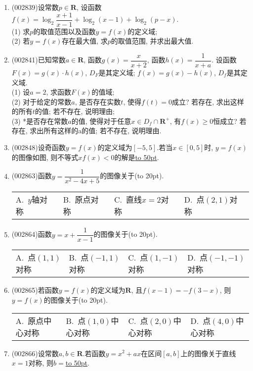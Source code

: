 \documentclass[10pt,a4paper]{article}
\newcommand{\blank}[1]{\underline{\hbox to #1pt{}}}
\newcommand{\bracket}[1]{(\hbox to #1pt{})}
\newcommand{\fourch}[4]{\par\begin{tabular}{p{.23\textwidth}p{.23\textwidth}p{.23\textwidth}p{.23\textwidth}}
A.~#1 &B.~#2& C.~#3& D.~#4
\end{tabular}}
\begin{document}
\begin{enumerate}[1.]
\fourch{$\sqrt3$}{$\dfrac{\sqrt{3}}2$}{$\dfrac{\sqrt{3}}3$}{$0$}
\item {\tiny (002839)}设常数$p\in \mathbf{R}$, 设函数$f(x)=\log_2\dfrac{x+1}{x-1}+\log_2(x-1)+\log_2(p-x)$.\\
(1) 求$p$的取值范围以及函数$y=f(x)$的定义域;\\
(2) 若$y=f(x)$存在最大值, 求$p$的取值范围, 并求出最大值.
\item {\tiny (002841)}已知常数$a\in \mathbf{R}$, 函数$g(x)=\dfrac x{x+2}$, 函数$h(x)=\dfrac 1{x+a}$. 设函数$F(x)=g(x)\cdot h(x)$, $D_F$是其定义域; $f(x)=g(x)-h(x)$, $D_f$是其定义域.\\
(1) 设$a=2$, 求函数$F(x)$的值域;\\
(2) 对于给定的常数$a$, 是否存在实数$t$, 使得$f(t)=0$成立? 若存在, 求出这样的所有$t$的值; 若不存在, 说明理由;\\
(3) *是否存在常数$a$的值, 使得对于任意$x\in {D_f}\cap \mathbf{R}^+$, 有$f(x)\ge 0$恒成立? 若存在, 求出所有这样的a的值; 若不存在, 说明理由.
\item {\tiny (002848)}设奇函数$y=f(x)$的定义域为$[-5, 5]$.若当$x\in [0,5]$时, $y=f(x)$的图像如图, 则不等式$xf(x)<0$的解是\blank{50}.
\begin{center}
\end{center}
\item {\tiny (002863)}函数$y=\dfrac 1{x^2-4x+5}$的图像关于\bracket{20}.
\fourch{$y$轴对称}{原点对称}{直线$x=2$对称}{点$(2,1)$对称}
\item {\tiny (002864)}函数$y=x+\dfrac 1{x-1}$的图像关于\bracket{20}.
\fourch{点$(1,1)$对称}{点$(-1,1)$对称}{点$(1,-1)$对称}{点$(-1,-1)$对称}
\item {\tiny (002865)}若函数$y=f(x)$的定义域为$\mathbf{R}$, 且$f(x-1)=-f(3-x)$, 则$y=f(x)$的图像关于\bracket{20}.
\fourch{原点中心对称}{点$(1,0)$中心对称}{点$(2,0)$中心对称}{点$(4,0)$中心对称}
\item {\tiny (002866)}设常数$a,b\in \mathbf{R}$.若函数$y=x^2+ax$在区间$[a,b]$上的图像关于直线$x=1$对称, 则$b=$\blank{50}.

\end{enumerate}
\end{document}

